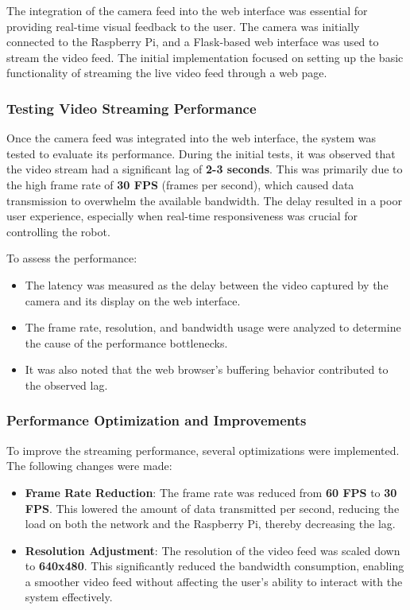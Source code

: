 The integration of the camera feed into the web interface was essential for providing real-time visual feedback to the user. The camera was initially connected to the Raspberry Pi, and a Flask-based web interface was used to stream the video feed. The initial implementation focused on setting up the basic functionality of streaming the live video feed through a web page.

\subsubsection{Testing Video Streaming Performance}

Once the camera feed was integrated into the web interface, the system was tested to evaluate its performance. During the initial tests, it was observed that the video stream had a significant lag of \textbf{2-3 seconds}. This was primarily due to the high frame rate of \textbf{30 FPS} (frames per second), which caused data transmission to overwhelm the available bandwidth. The delay resulted in a poor user experience, especially when real-time responsiveness was crucial for controlling the robot.

To assess the performance:
\begin{itemize}
	\item The latency was measured as the delay between the video captured by the camera and its display on the web interface.
	\item The frame rate, resolution, and bandwidth usage were analyzed to determine the cause of the performance bottlenecks.
	\item It was also noted that the web browser’s buffering behavior contributed to the observed lag.
\end{itemize}

\subsubsection{Performance Optimization and Improvements}

To improve the streaming performance, several optimizations were implemented. The following changes were made:

\begin{itemize}
	\item \textbf{Frame Rate Reduction}: The frame rate was reduced from \textbf{60 FPS} to \textbf{30 FPS}. This lowered the amount of data transmitted per second, reducing the load on both the network and the Raspberry Pi, thereby decreasing the lag.
	\item \textbf{Resolution Adjustment}: The resolution of the video feed was scaled down to \textbf{640x480}. This significantly reduced the bandwidth consumption, enabling a smoother video feed without affecting the user's ability to interact with the system effectively.
\end{itemize}

